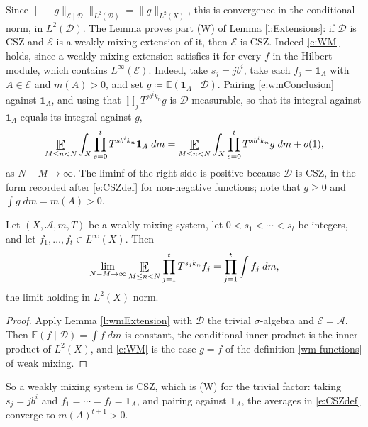 Since $\lVert\, \lVert g\rVert _{\mathcal E\mid \mathcal D}\rVert _{L^2(\mathcal D)} = \lVert g\rVert _{L^2(X)}$, this is convergence in the conditional norm, in $L^2(\mathcal D)$.
The Lemma proves part (W) of Lemma \ref{l:Extensions}: if $\mathcal D$ is CSZ and $\mathcal E$ is a weakly mixing extension of it, then $\mathcal E$ is CSZ.
Indeed \eqref{e:WM} holds, since a weakly mixing extension satisfies it for every $f$ in the Hilbert module, which contains $L^\infty(\mathcal E)$.
Indeed, take $s_j = jb ^{i}$, take each $f_j = \mathbf 1_A$ with $A \in \mathcal E$ and $m(A)>0$, and set $g \coloneqq \mathbb E (\mathbf 1_A \mid \mathcal D)$.
Pairing \eqref{e:wmConclusion} against $\mathbf 1_A$, and using that $\prod_j T ^{jb ^{i}k_n}g$ is $\mathcal D$ measurable, so that its integral against $\mathbf 1_A$ equals its integral against $g$,
\begin{equation}
\Expectation_{M\leq n<N} \int _X \prod _{s=0}^t T ^{sb ^{i}k_n}\mathbf 1_A \;dm
= \Expectation_{M\leq n<N} \int _X \prod _{s=0}^t T ^{sb ^{i}k_n} g \;dm + o(1) ,
\end{equation}
as $N-M\to\infty$.  The liminf of the right side is positive because $\mathcal D$ is CSZ, in the form recorded after \eqref{e:CSZdef} for non-negative functions;
note that $g \geq 0$ and $\int g \;dm = m(A)>0$.

\begin{corollary} \label{t:wm}  Let  $(X,\mathcal A, m,T)$ be a weakly mixing system, let $0<s_1 < \cdots < s_t$ be integers,
 and let  $f_1 , \ldots, f_t \in L^\infty (X)$.  Then
 \begin{equation}
  \lim_{N-M\to\infty}  \Expectation_{M\leq n<N}  \prod _{j=1}^t
  T^{s_j k_n}f_j =\prod _{j=1}^t \int f_j \;dm,
  \end{equation}
  the limit holding in $L^2( X)$ norm.
\end{corollary}

\begin{proof}
Apply Lemma \ref{l:wmExtension} with $\mathcal D$ the trivial $\sigma$-algebra and $\mathcal E = \mathcal A$.
Then $\mathbb E(f \mid \mathcal D) = \int f \;dm$ is constant, the conditional inner product is the inner product of $L^2(X)$,
and \eqref{e:WM} is the case $g=f$ of the definition \eqref{wm-functions} of weak mixing.
\end{proof}

So a weakly mixing system is CSZ, which is (W) for the trivial factor: taking $s_j = jb ^{i}$ and $f_1 = \cdots = f_t = \mathbf 1_A$,
and pairing against $\mathbf 1_A$, the averages in \eqref{e:CSZdef} converge to $m(A) ^{t+1}>0$.

